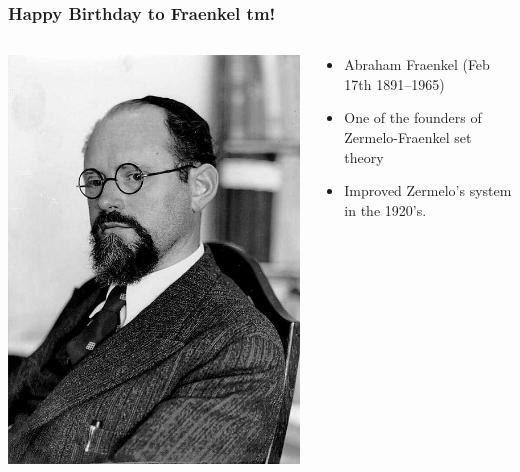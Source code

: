 \begin{frame}
  \frametitle{Happy Birthday to Fraenkel tm!}

  \begin{columns}
    \begin{column}{.5\textwidth}
      \includegraphics[height=.8\textheight]{../assets/Fraenkel_med}
    \end{column}
    \begin{column}{.5\textwidth}
      \begin{itemize}[<+->]
        \item Abraham Fraenkel (Feb 17th 1891--1965)
        \item One of the founders of Zermelo-Fraenkel set theory
\item Improved Zermelo's system in the 1920's. 
      \end{itemize}
    \end{column}
  \end{columns}
\end{frame}


